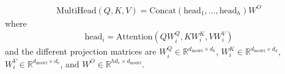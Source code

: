 \begin{align}
\text{MultiHead}(Q, K, V) = \text{Concat}(\text{head}_1, \dots, \text{head}_h)W^O
\end{align}
where
\begin{align}
\text{head}_i = \text{Attention}(QW_i^Q, KW_i^K, VW_i^V)
\end{align}
and the different projection matrices are $W_i^Q \in \mathbb{R}^{d_{\text{model}} \times d_k}$, $W_i^K \in \mathbb{R}^{d_{\text{model}} \times d_k}$, $W_i^V \in \mathbb{R}^{d_{\text{model}} \times d_v}$, and $W^O \in \mathbb{R}^{hd_{v} \times d_{\text{model}}}$.







